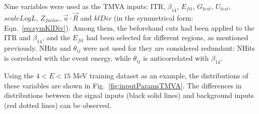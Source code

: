 Nine variables were used as the TMVA inputs: ITR, $\beta_{14}$, $E_{fit}$, $G_{test}$, $U_{test}$, $scaleLogL$, $Z_{factor}$, $\vec{u}\cdot \vec{R}$ and $klDiv$ (in the symmetrical form: Eqn.~\ref{eq:symKlDiv}). Among them, the beforehand cuts had been applied to the ITR and $\beta_{14}$, and the $E_{fit}$ had been selected for different regions, as mentioned previously. NHits and $\theta_{ij}$ were not used for they are considered redundant:  NHits is correlated with the event energy, while $\theta_{ij}$ is anticorrelated with $\beta_{14}$. 

Using the $4<E<15$ MeV training dataset as an example, the distributions of these variables are shown in Fig.~\ref{fig:inputParamsTMVA}. The differences in distributions between the signal inputs (black solid lines) and background inputs (red dotted lines) can be observed.

